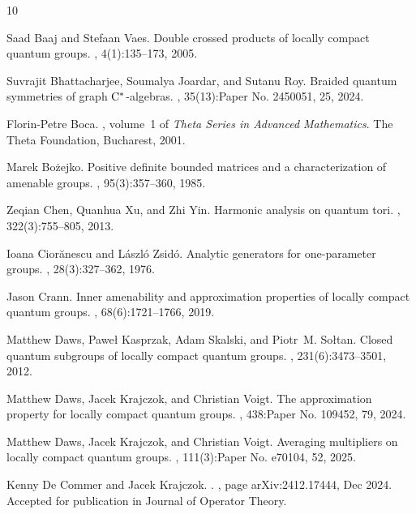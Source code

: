 \documentclass[12pt,reqno,a4paper]{amsart}
\theoremstyle{definition}
\numberwithin{equation}{section}
\begin{document}
\begin{thebibliography}{10}

Saad Baaj and Stefaan Vaes.
\newblock Double crossed products of locally compact quantum groups.
, 4(1):135--173, 2005.

Suvrajit Bhattacharjee, Soumalya Joardar, and Sutanu Roy.
\newblock Braided quantum symmetries of graph {${\rm C}^*$}-algebras.
, 35(13):Paper No. 2450051, 25, 2024.

Florin-Petre Boca.
,
  volume~1 of {\em Theta Series in Advanced Mathematics}.
\newblock The Theta Foundation, Bucharest, 2001.

Marek Bo\.zejko.
\newblock Positive definite bounded matrices and a characterization of amenable
  groups.
, 95(3):357--360, 1985.

Zeqian Chen, Quanhua Xu, and Zhi Yin.
\newblock Harmonic analysis on quantum tori.
, 322(3):755--805, 2013.

Ioana Cior\u{a}nescu and L\'aszl\'o Zsid\'o.
\newblock Analytic generators for one-parameter groups.
, 28(3):327--362, 1976.

Jason Crann.
\newblock Inner amenability and approximation properties of locally compact
  quantum groups.
, 68(6):1721--1766, 2019.

Matthew Daws, Pawe{\l} Kasprzak, Adam Skalski, and Piotr~M. So{\l}tan.
\newblock Closed quantum subgroups of locally compact quantum groups.
, 231(6):3473--3501, 2012.

Matthew Daws, Jacek Krajczok, and Christian Voigt.
\newblock The approximation property for locally compact quantum groups.
, 438:Paper No. 109452, 79, 2024.

Matthew Daws, Jacek Krajczok, and Christian Voigt.
\newblock Averaging multipliers on locally compact quantum groups.
, 111(3):Paper No. e70104, 52, 2025.

Kenny {De Commer} and Jacek {Krajczok}.
.
, page arXiv:2412.17444, Dec 2024. Accepted for
  publication in Journal of Operator Theory.


\end{thebibliography}
\end{document}

